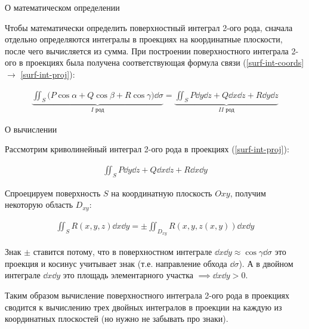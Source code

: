 
\begin{remark}
  О математическом определении

  Чтобы математически определить поверхностный интеграл 2-ого рода, сначала
  отдельно определяются интегралы в проекциях на координатные плоскости, после
  чего вычисляется из сумма. При построении поверхностного интеграла 2-ого в
  проекциях была получена соответствующая формула связи
  (\ref{surf-int-coords} \(\to\) \ref{surf-int-proj}):

  \begin{align*}
    \underbrace{\iint_{S} \Big(
      P \cos \alpha +
      Q \cos \beta +
      R \cos \gamma\Big
    ) \dd \sigma}_{I \text{ род}} =
    \underbrace{\iint_{S}
      P \dd y \dd z +
      Q \dd x \dd z +
      R \dd y \dd z
    }_{II \text{ род}}
  \end{align*}
\end{remark}

\begin{remark}
  О вычислении

  Рассмотрим криволинейный интеграл 2-ого рода в проекциях
  (\ref{surf-int-proj}):

  \begin{align*}
    \iint_{S} P \dd y \dd z + Q \dd x \dd z + R \dd x \dd y  
  \end{align*}

  Спроецируем поверхность \(S\) на координатную плоскость \(Oxy\), получим
  некоторую область \(D_{xy}\):

  \begin{align*}\label{eq:surf-int-proj-calc}\tag{\(\bigstar\)}
    \iint_{S} R(x, y, z) \dd x \dd y
    = \pm \iint_{D_{xy}} R(x, y, z(x, y)) \dd x \dd y
  \end{align*}

  Знак \(\pm\) ставится потому, что в поверхностном интеграле
  \(\dd x \dd y \approx \cos \gamma \dd \sigma\) это проекция и косинус
  учитывает знак (т.е. направление обхода \(\dd \sigma\)). А в двойном интеграле
  \(\dd x \dd y\) это площадь элементарного участка
  \(\implies \dd x \dd y > 0\).

  Таким образом вычисление поверхностного интеграла 2-ого рода в проекциях
  сводится к вычислению трех двойных интегралов в проекции на каждую из
  координатных плоскостей (но нужно не забывать про знаки).
\end{remark}
